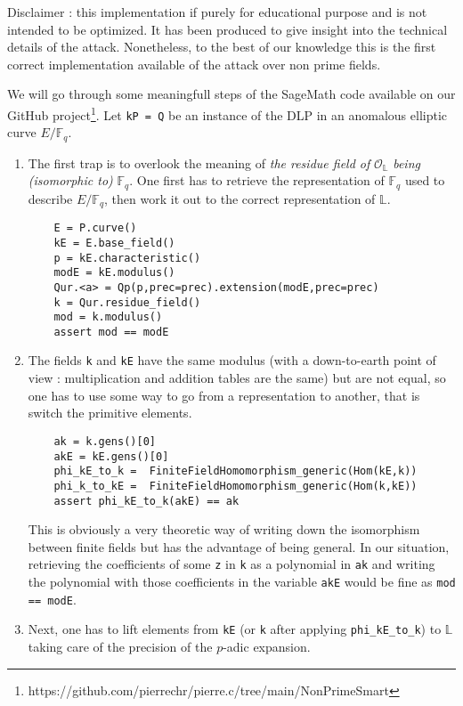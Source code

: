 \documentclass[10pt]{article}
\theoremstyle{definition}
\newcommand{\F}{\mathbb{F}}
\renewcommand{\L}{\mathbb{L}}
\begin{document}
Disclaimer : this implementation if purely for educational purpose and is not intended to be optimized. 
It has been produced  to give insight into the technical details of the attack.
Nonetheless, to the best of our knowledge this is the first correct implementation available of the attack over non prime fields.

We will go through some meaningfull steps of the SageMath code available on our GitHub project\footnote{https://github.com/pierrechr/pierre.c/tree/main/NonPrimeSmart}.
Let \verb|kP = Q| be an instance of the DLP in an anomalous elliptic curve $E/\F_q$.
\begin{enumerate}
\item  The first trap is to overlook the meaning of \textsl{ the residue field of } $\mathcal{O}_{\L}$ \textsl{being (isomorphic to)} $\F_q$.
One first has to retrieve the representation of $\F_q$ used to describe $E/\F_q$, then work it out to the correct representation of $\L$.

\begin{verbatim}
    E = P.curve()
    kE = E.base_field()
    p = kE.characteristic()
    modE = kE.modulus()
    Qur.<a> = Qp(p,prec=prec).extension(modE,prec=prec)
    k = Qur.residue_field()
    mod = k.modulus()
    assert mod == modE
\end{verbatim}

\item The fields \verb|k|  and \verb|kE| have the same modulus (with a down-to-earth point of view : multiplication and addition tables are the same) but are not equal, so one has to use some way to go from a representation to another, that is switch the primitive elements. 

\begin{verbatim}
    ak = k.gens()[0]
    akE = kE.gens()[0]
    phi_kE_to_k =  FiniteFieldHomomorphism_generic(Hom(kE,k))
    phi_k_to_kE =  FiniteFieldHomomorphism_generic(Hom(k,kE))
    assert phi_kE_to_k(akE) == ak
\end{verbatim}

This is obviously a very theoretic way of writing down the isomorphism between finite fields but has the advantage of being general.
In our situation, retrieving the coefficients of some \verb|z| in \verb|k| as a polynomial in \verb|ak| and writing the polynomial with those coefficients in the variable \verb|akE| would be fine as \verb|mod == modE|. 

\item Next, one has to lift elements from \verb|kE| (or \verb|k| after applying \verb|phi_kE_to_k|) to $\L$ taking care of the precision of the $p$-adic expansion.


\end{enumerate}
\end{document}
